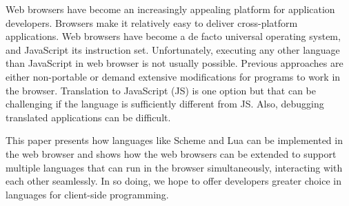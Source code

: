 Web browsers have become an increasingly appealing platform for application developers. Browsers make it relatively easy to deliver cross-platform applications. Web browsers have become a de facto universal operating system, and JavaScript its instruction set. Unfortunately, executing any other language than JavaScript in web browser is not usually possible. Previous approaches are either non-portable or demand extensive modifications for programs to work in the browser. Translation to JavaScript (JS) is one option but that can be challenging if the language is sufficiently different from JS. Also, debugging translated applications can be difficult.

This paper presents how languages like Scheme and Lua can be implemented in the web browser and shows how the web browsers can be extended to support multiple languages that can run in the browser simultaneously, interacting with each other seamlessly. In so doing, we hope to offer developers greater choice in languages for client-side programming.


